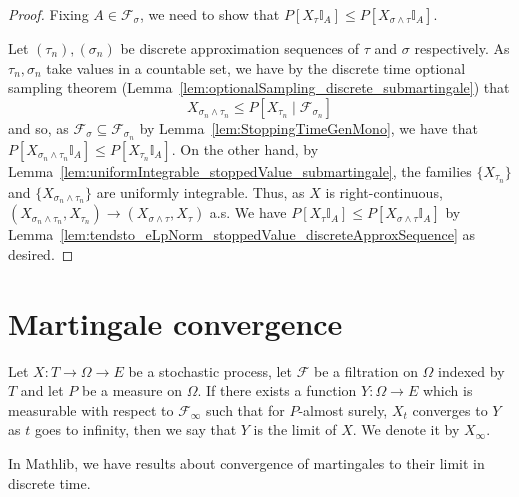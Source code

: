\begin{proof}
  Fixing $A \in \mathcal{F}_{\sigma}$, we need to show that $P[X_{\tau} \mathbb{I}_A] \le P[X_{\sigma \wedge \tau} \mathbb{I}_A]$.

  Let $(\tau_n), (\sigma_n)$ be discrete approximation sequences of $\tau$ and $\sigma$ respectively.
  As $\tau_n, \sigma_n$ take values in a countable set,
  we have by the discrete time optional sampling theorem (Lemma~\ref{lem:optionalSampling_discrete_submartingale}) that
  $$X_{\sigma_n \wedge \tau_n} \le P[X_{\tau_n} \mid \mathcal{F}_{\sigma_n}]$$
  and so, as \(\mathcal{F}_{\sigma} \subseteq \mathcal{F}_{\sigma_n}\) by Lemma~\ref{lem:StoppingTimeGenMono},
  we have that $P[X_{\sigma_n \wedge \tau_n} \mathbb{I}_A] \le P[X_{\tau_n} \mathbb{I}_A]$.
  On the other hand, by Lemma~\ref{lem:uniformIntegrable_stoppedValue_submartingale}, the families $\{X_{\tau_n}\}$ and $\{X_{\sigma_n \wedge \tau_n}\}$ are uniformly integrable.
  Thus, as $X$ is right-continuous, $(X_{\sigma_n \wedge \tau_n}, X_{\tau_n}) \to (X_{\sigma \wedge \tau}, X_{\tau})$ a.s.
  We have $P[X_{\tau} \mathbb{I}_A] \le P[X_{\sigma \wedge \tau} \mathbb{I}_A]$
  by Lemma~\ref{lem:tendsto_eLpNorm_stoppedValue_discreteApproxSequence} as desired.
\end{proof}

\section{Martingale convergence}

\begin{definition}\label{def:limitProcess}
  \mathlibok
Let $X : T \to \Omega \to E$ be a stochastic process, let $\mathcal{F}$ be a filtration on $\Omega$ indexed by $T$ and let $P$ be a measure on $\Omega$.
If there exists a function $Y : \Omega \to E$ which is measurable with respect to $\mathcal{F}_\infty$ such that for $P$-almost surely, $X_t$ converges to $Y$ as $t$ goes to infinity, then we say that $Y$ is the limit of $X$.
We denote it by $X_\infty$.
\end{definition}


In Mathlib, we have results about convergence of martingales to their limit in discrete time.


